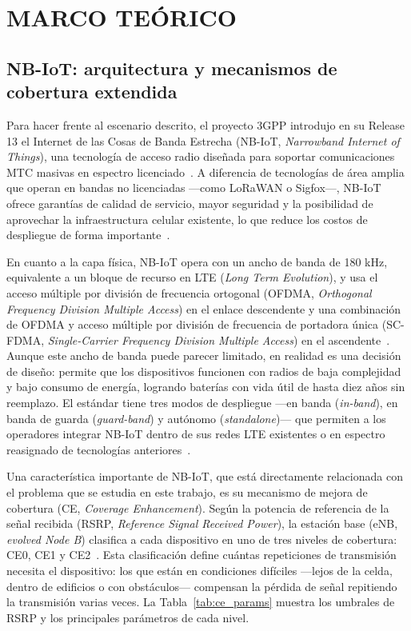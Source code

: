 \chapter{MARCO TEÓRICO}


\section{NB-IoT: arquitectura y mecanismos de cobertura extendida}

Para hacer frente al escenario descrito, el proyecto 3GPP introdujo en su Release 13 el
Internet de las Cosas de Banda Estrecha (NB-IoT, \textit{Narrowband Internet of Things}),
una tecnología de acceso radio diseñada para soportar comunicaciones MTC masivas en espectro
licenciado~\cite{ref3, ref7}. A diferencia de tecnologías de área amplia que operan en bandas
no licenciadas ---como LoRaWAN o Sigfox---, NB-IoT ofrece garantías de calidad de servicio,
mayor seguridad y la posibilidad de aprovechar la infraestructura celular existente, lo que
reduce los costos de despliegue de forma importante~\cite{ref3}.

En cuanto a la capa física, NB-IoT opera con un ancho de banda de 180 kHz, equivalente a un
bloque de recurso en LTE (\textit{Long Term Evolution}), y usa el acceso múltiple por división
de frecuencia ortogonal (OFDMA, \textit{Orthogonal
Frequency Division Multiple Access}) en el enlace descendente y una combinación de OFDMA y
acceso múltiple por división de frecuencia de portadora única (SC-FDMA, \textit{Single-Carrier
Frequency Division Multiple Access}) en el ascendente~\cite{ref7}. Aunque este ancho de banda puede parecer limitado, en realidad es una
decisión de diseño: permite que los dispositivos funcionen con radios de baja complejidad y
bajo consumo de energía, logrando baterías con vida útil de hasta diez años sin
reemplazo. El estándar tiene tres modos de despliegue ---en banda (\textit{in-band}), en
banda de guarda (\textit{guard-band}) y autónomo (\textit{standalone})--- que permiten a los
operadores integrar NB-IoT dentro de sus redes LTE existentes o en espectro reasignado de
tecnologías anteriores~\cite{ref3, ref12}.

Una característica importante de NB-IoT, que está directamente relacionada con el problema
que se estudia en este trabajo, es su mecanismo de mejora de cobertura (CE,
\textit{Coverage Enhancement}). Según la potencia de referencia de la señal recibida (RSRP,
\textit{Reference Signal Received Power}), la estación base (eNB, \textit{evolved Node B}) clasifica a cada dispositivo en
uno de tres niveles de cobertura: CE0, CE1 y CE2~\cite{ref4}. Esta clasificación define
cuántas repeticiones de transmisión necesita el dispositivo: los que están en condiciones
difíciles ---lejos de la celda, dentro de edificios o con obstáculos--- compensan la pérdida
de señal repitiendo la transmisión varias veces. La Tabla~\ref{tab:ce_params} muestra los
umbrales de RSRP y los principales parámetros de cada nivel.

